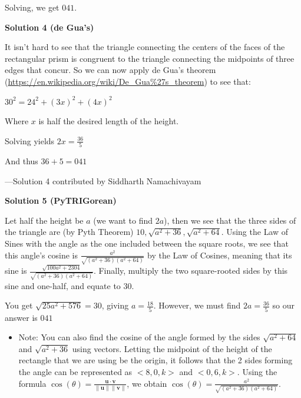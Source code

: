 \begin{enumerate}
 Solving, we get $\boxed{041}$.

 



\textbf{Solution 4 (de Gua's)}

It isn't hard to see that the triangle connecting the centers of the faces of the rectangular prism is congruent to the triangle connecting the midpoints of three edges that concur. So we can now apply de Gua's theorem (\href{https://en.wikipedia.org/wiki/De\_Gua\%27s\_theorem}{https://en.wikipedia.org/wiki/De\_Gua\%27s\_theorem}) to see that:

 $30^2=24^2+(3x)^2+(4x)^2$

 Where $x$ is half the desired length of the height.

 Solving yields $2x=\frac{36}{5}$

 And thus $36+5=\boxed{041}$

 ---Solution 4 contributed by Siddharth Namachivayam

 



\textbf{Solution 5 (PyTRIGorean)}

Let half the height be $a$ (we want to find $2a$), then we see that the three sides of the triangle are (by Pyth Theorem) $10, \sqrt{a^2+36}, \sqrt{a^2+64}$. Using the Law of Sines with the angle as the one included between the square roots, we see that this angle's cosine is $\frac{a^2}{\sqrt{(a^2+36)(a^2+64)}}$ by the Law of Cosines, meaning that its sine is $\frac{\sqrt{100a^2+2304}}{\sqrt{(a^2+36)(a^2+64)}}$. Finally, multiply the two square-rooted sides by this sine and one-half, and equate to 30.

 You get $\sqrt{25a^2+576} = 30$, giving $a=\frac{18}{5}$. However, we must find $2a=\frac{36}{5}$ so our answer is $\boxed{041}$

            \begin{itemize}
        \item Note: You can also find the cosine of the angle formed by the sides $\sqrt{a^2+64}$ and $\sqrt{a^2+36}$ using vectors. Letting the midpoint of the height of the rectangle that we are using be the origin, it follows that the 2 sides forming the angle can be represented as $<8,0,k>$ and $<0,6,k>$. Using the formula $\cos(\theta)=\frac{\mathbf{u}\cdot\mathbf{v}}{\|\mathbf{u}\|\|\mathbf{v}\|}$, we obtain $\cos(\theta)=\frac{a^2}{\sqrt{(a^2+36)(a^2+64)}}$.
            \end{itemize}
            





\end{enumerate}
